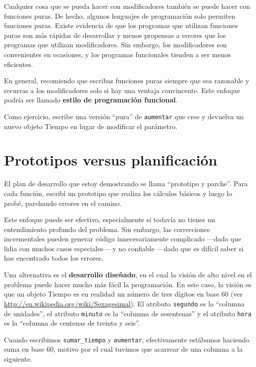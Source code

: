 \documentclass[10pt]{book}
\begin{document}
Cualquier cosa que se pueda hacer con modificadores también se puede hacer con funciones
puras.  De hecho, algunos lenguajes de programación solo permiten funciones
puras.  Existe evidencia de que los programas que utilizan funciones puras
son más rápidas de desarrollar y menos propensas a errores que los programas
que utilizan modificadores.  Sin embargo, los modificadores son convenientes en ocasiones,
y los programas funcionales tienden a ser menos eficientes.

En general, recomiendo que escribas funciones puras siempre que sea
razonable y recurras a los modificadores solo si hay una ventaja
convincente.  Este enfoque podría ser llamado {\bf estilo de
programación funcional}.

Como ejercicio, escribe una versión ``pura'' de {\tt aumentar} que
cree y devuelva un nuevo objeto Tiempo en lugar de modificar el
parámetro.


\section{Prototipos versus planificación}
\label{prototype}

El plan de desarrollo que estoy demostrando se llama ``prototipo y
parche''.  Para cada función, escribí un prototipo que realiza los
cálculos básicos y luego lo probé, parchando errores en el
camino.

Este enfoque puede ser efectivo, especialmente si todavía no tienes
un entendimiento profundo del problema.  Sin embargo, las correcciones incrementales pueden
generar código innecesariamente complicado ---dado que lidia con muchos
casos especiales--- y no confiable ---dado que es difícil saber si
has encontrado todos los errores.

Una alternativa es el {\bf desarrollo diseñado}, en el cual la visión
de alto nivel en el problema puede hacer mucho más fácil la programación.  En
este caso, la visión es que un objeto Tiempo es en realidad un número
de tres dígitos en base 60 (ver \url{http://en.wikipedia.org/wiki/Sexagesimal}).  El
atributo {\tt segundo} es la ``columna de unidades'', el atributo {\tt minuto}
es la ``columna de sesentenas'' y el atributo {\tt hora} es
la ``columna de centenas de treinta y seis''.

Cuando escribimos \verb"sumar_tiempo" y {\tt aumentar}, efectivamente estábamos
haciendo suma en base 60, motivo por el cual tuvimos que acarrear de una
columna a la siguiente.
\end{document}

